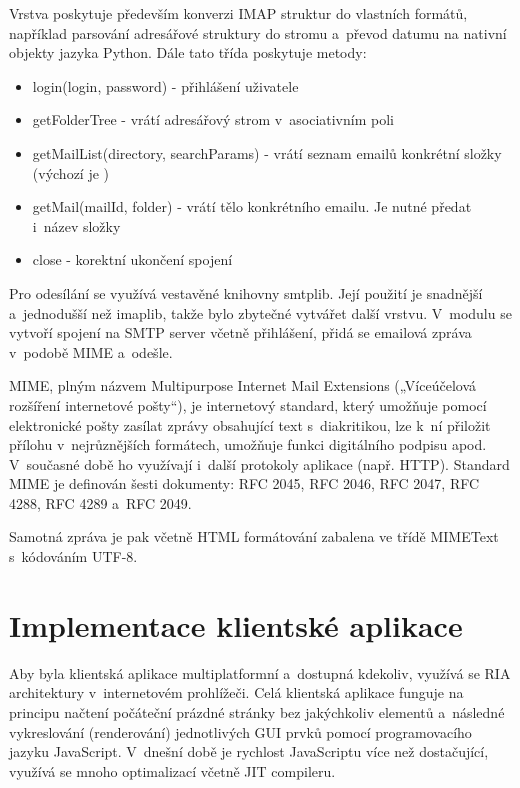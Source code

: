 \documentclass[bc,male,html,dept460]{diploma}				%
\begin{document}
Vrstva poskytuje především konverzi IMAP struktur do vlastních formátů, například parsování adresářové struktury do stromu a~převod datumu na nativní objekty jazyka Python. 
Dále tato třída poskytuje metody:

\begin{itemize}
 \item login(login, password) - přihlášení uživatele
 \item getFolderTree - vrátí adresářový strom v~asociativním poli
 \item getMailList(directory, searchParams) - vrátí seznam emailů konkrétní složky (výchozí je )
 \item getMail(mailId, folder) - vrátí tělo konkrétního emailu. Je nutné předat i~název složky
 \item close - korektní ukončení spojení
\end{itemize}


\bigskip

Pro odesílání se využívá vestavěné knihovny smtplib. Její použití je snadnější a~jednodušší než imaplib, takže bylo zbytečné vytvářet další vrstvu. V~modulu se vytvoří spojení na SMTP server včetně přihlášení, přidá se emailová zpráva v~podobě MIME a~odešle.

MIME, plným názvem Multipurpose Internet Mail Extensions („Víceúčelová rozšíření internetové pošty“), je internetový standard, který umožňuje pomocí elektronické pošty zasílat zprávy obsahující text s~diakritikou, lze k~ní přiložit přílohu v~nejrůznějších formátech, umožňuje funkci digitálního podpisu apod. V~současné době ho využívají i~další protokoly aplikace (např. HTTP). Standard MIME je definován šesti dokumenty: RFC 2045, RFC 2046, RFC 2047, RFC 4288, RFC 4289 a~RFC 2049.
\cite{smtp-wiki}

Samotná zpráva je pak včetně HTML formátování zabalena ve třídě MIMEText s~kódováním UTF-8.





\section{Implementace klientské aplikace}
Aby byla klientská aplikace multiplatformní a~dostupná kdekoliv, využívá se RIA architektury v~internetovém prohlížeči.
Celá klientská aplikace funguje na principu načtení počáteční prázdné stránky bez jakýchkoliv elementů a~následné vykreslování (renderování) jednotlivých GUI prvků pomocí programovacího jazyku JavaScript. V~dnešní době je rychlost JavaScriptu více než dostačující, využívá se mnoho optimalizací včetně JIT compileru.
\end{document}
